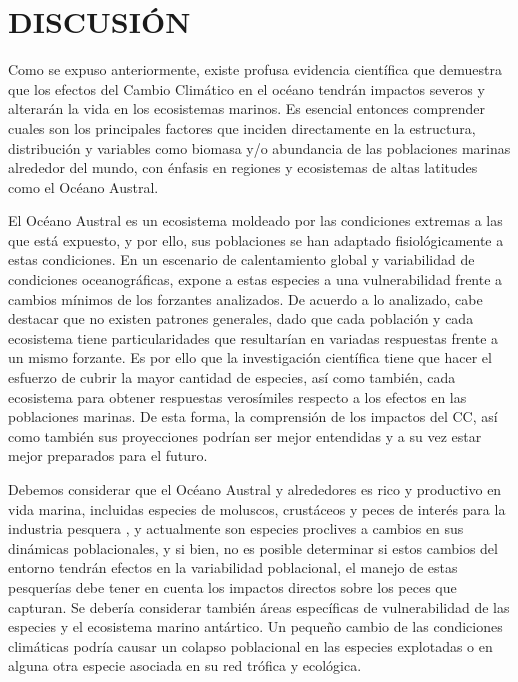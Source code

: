 \documentclass{umagthesis}
\begin{document}
\pagebreak

\hypertarget{discusiuxf3n}{%
\section{DISCUSIÓN}\label{discusiuxf3n}}

Como se expuso anteriormente, existe profusa evidencia científica que demuestra que los efectos del Cambio Climático en el océano tendrán impactos severos y alterarán la vida en los ecosistemas marinos. Es esencial entonces comprender cuales son los principales factores que inciden directamente en la estructura, distribución y variables como biomasa y/o abundancia de las poblaciones marinas alrededor del mundo, con énfasis en regiones y ecosistemas de altas latitudes como el Océano Austral.

El Océano Austral es un ecosistema moldeado por las condiciones extremas a las que está expuesto, y por ello, sus poblaciones se han adaptado fisiológicamente a estas condiciones. En un escenario de calentamiento global y variabilidad de condiciones oceanográficas, expone a estas especies a una vulnerabilidad frente a cambios mínimos de los forzantes analizados. De acuerdo a lo analizado, cabe destacar que no existen patrones generales, dado que cada población y cada ecosistema tiene particularidades que resultarían en variadas respuestas frente a un mismo forzante. Es por ello que la investigación científica tiene que hacer el esfuerzo de cubrir la mayor cantidad de especies, así como también, cada ecosistema para obtener respuestas verosímiles respecto a los efectos en las poblaciones marinas. De esta forma, la comprensión de los impactos del CC, así como también sus proyecciones podrían ser mejor entendidas y a su vez estar mejor preparados para el futuro.

Debemos considerar que el Océano Austral y alrededores es rico y productivo en vida marina, incluidas especies de moluscos, crustáceos y peces de interés para la industria pesquera \autocite{Arana2020b}, y actualmente son especies proclives a cambios en sus dinámicas poblacionales, y si bien, no es posible determinar si estos cambios del entorno tendrán efectos en la variabilidad poblacional, el manejo de estas pesquerías debe tener en cuenta los impactos directos sobre los peces que capturan. Se debería considerar también áreas específicas de vulnerabilidad de las especies y el ecosistema marino antártico. Un pequeño cambio de las condiciones climáticas podría causar un colapso poblacional en las especies explotadas o en alguna otra especie asociada en su red trófica y ecológica.
\end{document}
